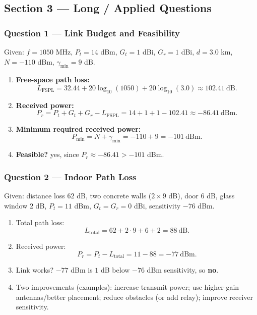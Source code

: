 \documentclass[11pt,a4paper]{article}
\begin{document}
\subsection*{Section 3 --- Long / Applied Questions}

\subsubsection*{Question 1 --- Link Budget and Feasibility}
Given: $f=1050$ MHz, $P_t=14$ dBm, $G_t=1$ dBi, $G_r=1$ dBi, $d=3.0$ km, $N=-110$ dBm, $\gamma_{\min}=9$ dB.

\begin{enumerate}[label=\alph*.]
    \item \textbf{Free-space path loss:}
    \[
    L_{\mathrm{FSPL}}=32.44+20\log_{10}(1050)+20\log_{10}(3.0)\approx 102.41\ \mathrm{dB}.
    \]
    \item \textbf{Received power:}
    \[
    P_r=P_t+G_t+G_r-L_{\mathrm{FSPL}}=14+1+1-102.41\approx -86.41\ \mathrm{dBm}.
    \]
    \item \textbf{Minimum required received power:}
    \[
    P_{\min}=N+\gamma_{\min}=-110+9=-101\ \mathrm{dBm}.
    \]
    \item \textbf{Feasible?} yes, since $P_r\approx -86.41 > -101$ dBm.
    
\end{enumerate}

\subsubsection*{Question 2 --- Indoor Path Loss}
Given: distance loss $62$ dB, two concrete walls ($2\times 9$ dB), door $6$ dB, glass window $2$ dB, $P_t=11$ dBm, $G_t=G_r=0$ dBi, sensitivity $-76$ dBm.

\begin{enumerate}[label=\alph*.]
    \item Total path loss:
    \[
    L_{\text{total}}=62+2\cdot 9+6+2=88\ \mathrm{dB}.
    \]
    \item Received power:
    \[
    P_r=P_t-L_{\text{total}}=11-88=-77\ \mathrm{dBm}.
    \]
    \item Link works? $-77$ dBm is $1$ dB below $-76$ dBm sensitivity, so \textbf{no}.
    \item Two improvements (examples): increase transmit power; use higher-gain antennas/better placement; reduce obstacles (or add relay); improve receiver sensitivity.
\end{enumerate}
\end{document}
